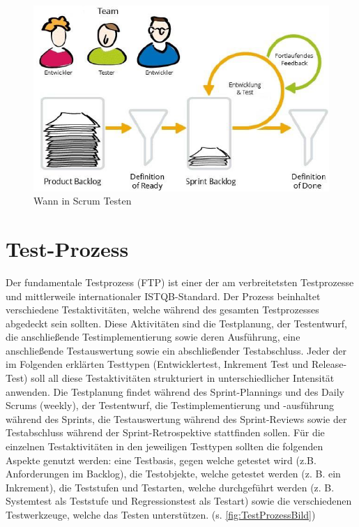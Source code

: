 \begin{figure}[!htb]
  \centering
  \includegraphics[width=.9\textwidth]{figures/rebecca/Wann_In_Scrum_Testen.png}
  \caption[]{Wann in Scrum Testen}
  \label{fig:WannTesten}
\end{figure}

\section{Test-Prozess}
\label{sec:TestProzess}

Der fundamentale Testprozess (FTP) ist einer der am verbreitetsten Testprozesse und mittlerweile internationaler ISTQB-Standard. Der Prozess beinhaltet verschiedene Testaktivitäten, welche während des gesamten Testprozesses abgedeckt sein sollten. Diese Aktivitäten sind die Testplanung, der Testentwurf, die anschließende Testimplementierung sowie deren Ausführung, eine anschließende Testauswertung sowie ein abschließender Testabschluss. Jeder der im Folgenden erklärten Testtypen (Entwicklertest, Inkrement Test und Release-Test) soll all diese Testaktivitäten strukturiert in unterschiedlicher Intensität anwenden. Die Testplanung findet während des Sprint-Plannings und des Daily Scrums (weekly), der Testentwurf, die Testimplementierung und -ausführung während des Sprints, die Testauswertung während des Sprint-Reviews sowie der Testabschluss während der Sprint-Retrospektive stattfinden sollen. Für die einzelnen Testaktivitäten in den jeweiligen Testtypen sollten die folgenden Aspekte genutzt werden: eine Testbasis, gegen welche getestet wird (z.B. Anforderungen im Backlog), die Testobjekte, welche getestet werden (z. B. ein Inkrement), die Teststufen und Testarten, welche durchgeführt werden (z. B. Systemtest als Teststufe und Regressionstest als Testart) sowie die verschiedenen Testwerkzeuge, welche das Testen unterstützen. (s. \autoref{fig:TestProzessBild})


